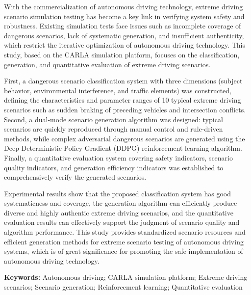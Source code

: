 With the commercialization of autonomous driving technology, extreme driving scenario simulation testing has become a key link in verifying system safety and robustness. Existing simulation tests face issues such as incomplete coverage of dangerous scenarios, lack of systematic generation, and insufficient authenticity, which restrict the iterative optimization of autonomous driving technology. This study, based on the CARLA simulation platform, focuses on the classification, generation, and quantitative evaluation of extreme driving scenarios.

First, a dangerous scenario classification system with three dimensions (subject behavior, environmental interference, and traffic elements) was constructed, defining the characteristics and parameter ranges of 10 typical extreme driving scenarios such as sudden braking of preceding vehicles and intersection conflicts. Second, a dual-mode scenario generation algorithm was designed: typical scenarios are quickly reproduced through manual control and rule-driven methods, while complex adversarial dangerous scenarios are generated using the Deep Deterministic Policy Gradient (DDPG) reinforcement learning algorithm. Finally, a quantitative evaluation system covering safety indicators, scenario quality indicators, and generation efficiency indicators was established to comprehensively verify the generated scenarios.

Experimental results show that the proposed classification system has good systematicness and coverage, the generation algorithm can efficiently produce diverse and highly authentic extreme driving scenarios, and the quantitative evaluation results can effectively support the judgment of scenario quality and algorithm performance. This study provides standardized scenario resources and efficient generation methods for extreme scenario testing of autonomous driving systems, which is of great significance for promoting the safe implementation of autonomous driving technology.

\textbf{Keywords:} Autonomous driving; CARLA simulation platform; Extreme driving scenarios; Scenario generation; Reinforcement learning; Quantitative evaluation